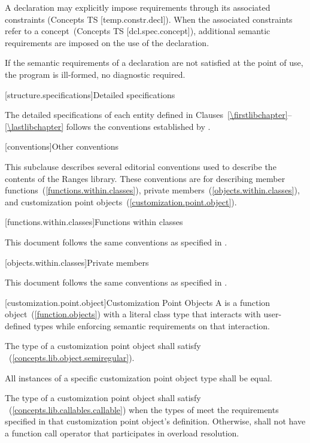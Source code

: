 \pnum
A declaration may explicitly impose requirements through its associated
constraints (Concepts TS [temp.constr.decl]). When the associated constraints
refer to a concept~(Concepts TS [dcl.spec.concept]), additional semantic requirements are
imposed on the use of the declaration.

\pnum
If the semantic requirements of a declaration are not satisfied at the
point of use, the program is ill-formed, no diagnostic required.

[structure.specifications]{Detailed specifications}

\pnum
The detailed specifications of each entity defined in
Clauses~\ref{\firstlibchapter}--\ref{\lastlibchapter} follows the conventions
established by .

[conventions]{Other conventions}
%

\pnum
This subclause describes several editorial conventions used to describe the contents
of the Ranges library. These conventions are for describing
member functions~(\ref{functions.within.classes}),
private members~(\ref{objects.within.classes}),
and customization point objects~(\ref{customization.point.object}).

[functions.within.classes]{Functions within classes}

\pnum
This document follows the same conventions as specified in .

[objects.within.classes]{Private members}

\pnum
This document follows the same conventions as specified in .

[customization.point.object]{Customization Point Objects}
\pnum
A  is a function object~(\ref{function.objects}) with a
literal class type that interacts with user-defined types while
enforcing semantic requirements on that interaction.

\pnum
The type of a customization point object shall satisfy
~(\ref{concepts.lib.object.semiregular}).

\pnum
All instances of a specific customization point object type shall
be equal.

\pnum
The type of a customization point object  shall satisfy
~(\ref{concepts.lib.callables.callable}) when the types of
 meet the requirements specified in that
customization point object's definition. Otherwise, 
shall not have a function call operator that participates in
overload resolution.

